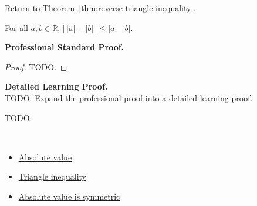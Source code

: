 \newpage
{}
\label{prf:reverse-triangle-inequality}

\begin{remark*}[Return]
\hyperref[thm:reverse-triangle-inequality]{Return to Theorem~\ref*{thm:reverse-triangle-inequality}.}
\end{remark*}

\begin{theorem*}
For all $a, b \in \mathbb{R}$,
$\lvert\,\lvert a \rvert - \lvert b \rvert\,\rvert \le \lvert a - b \rvert$.
\end{theorem*}

\textbf{Professional Standard Proof.}~\\
\begin{proof}
TODO.
\end{proof}

\textbf{Detailed Learning Proof.}~\\
TODO: Expand the professional proof into a detailed learning proof.


\begin{remark*}
TODO.
\end{remark*}

\begin{remark*}[Dependencies]~\\
\begin{itemize}
  \item \hyperref[def:absolute-value]{Absolute value}
  \item \hyperref[thm:triangle-inequality]{Triangle inequality}
  \item \hyperref[thm:absolute-value-symmetric]{Absolute value is symmetric}
\end{itemize}
\end{remark*}
